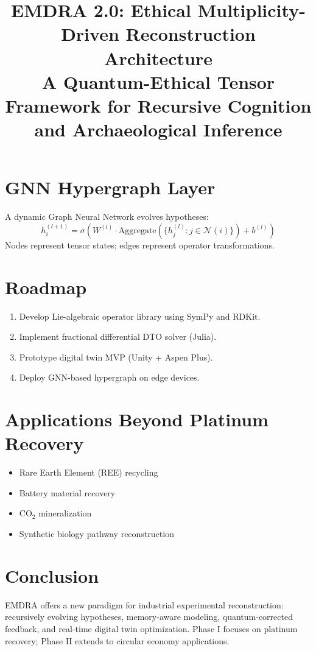 \documentclass[12pt]{article}
\begin{document}
\section{GNN Hypergraph Layer}
A dynamic Graph Neural Network evolves hypotheses:
\begin{equation}
h_i^{(l+1)} = \sigma\left( W^{(l)} \cdot \text{Aggregate}\left(\{h_j^{(l)} : j \in \mathcal{N}(i)\}\right) + b^{(l)} \right)
\end{equation}
Nodes represent tensor states; edges represent operator transformations.

\section{Roadmap}
\begin{enumerate}
    \item Develop Lie-algebraic operator library using SymPy and RDKit.
    \item Implement fractional differential DTO solver (Julia).
    \item Prototype digital twin MVP (Unity + Aspen Plus).
    \item Deploy GNN-based hypergraph on edge devices.
\end{enumerate}

\section{Applications Beyond Platinum Recovery}
\begin{itemize}
    \item Rare Earth Element (REE) recycling
    \item Battery material recovery
    \item CO$_2$ mineralization
    \item Synthetic biology pathway reconstruction
\end{itemize}

\section{Conclusion}
EMDRA offers a new paradigm for industrial experimental reconstruction: recursively evolving hypotheses, memory-aware modeling, quantum-corrected feedback, and real-time digital twin optimization. Phase I focuses on platinum recovery; Phase II extends to circular economy applications.
\title{\textbf{EMDRA 2.0: Ethical Multiplicity-Driven Reconstruction Architecture} \\
\large A Quantum-Ethical Tensor Framework for Recursive Cognition and Archaeological Inference}
\end{document}
